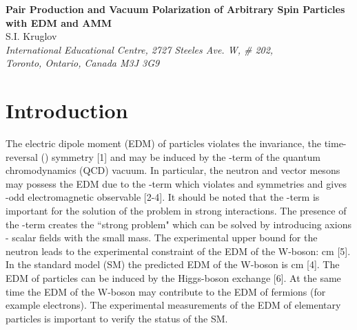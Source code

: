 \documentclass[a4paper,12pt]{article}
\begin{document}
\begin{center}
{\bf Pair Production and Vacuum Polarization of Arbitrary Spin
Particles with EDM and AMM}\\
\vspace{5mm}
 S.I. Kruglov \\
\vspace{5mm}
\textit{International Educational Centre, 2727 Steeles Ave. W, \# 202, \\
Toronto, Ontario, Canada M3J 3G9}
\end{center}

\begin{abstract}
The exact solutions of the wave equation for arbitrary spin particles with
electric dipole and magnetic moments in the constant and uniform
electromagnetic field were found. The differential probability of pair
production of particles by an external electromagnetic field has been
calculated on the basis of the exact solutions. We have also estimated the
imaginary part of the constant and uniform electromagnetic field. The
nonlinear corrections to the Maxwell Lagrangian have been calculated taking
into account the vacuum polarization of arbitrary spin particles. The role
of electric dipole and magnetic moments of arbitrary spin particles in
instability of the vacuum is discussed.
\end{abstract}

\section{Introduction}

The electric dipole moment (EDM) of particles violates the \coordHE{} invariance,
the time-reversal (\coordHE{}) symmetry [1] and may be induced by the \myHighlight{$\vartheta $}\coordHE{}
-term of the quantum chromodynamics (QCD) vacuum. In particular, the neutron
and vector mesons may possess the EDM due to the \myHighlight{$\vartheta $}\coordHE{}-term which
violates \coordHE{} and \coordHE{} symmetries and gives \coordHE{}-odd electromagnetic
observable [2-4]. It should be noted that the \myHighlight{$\vartheta $}\coordHE{}-term is important
for the solution of the \coordHE{} problem in strong interactions. The
presence of the \myHighlight{$\vartheta $}\coordHE{}-term creates the ``strong \coordHE{} problem" which
can be solved by introducing axions - scalar fields with the small mass. The
experimental upper bound for the neutron leads to the experimental
constraint of the EDM of the W-boson: \coordHE{} cm [5]. In the
standard model (SM) the predicted EDM of the W-boson is \coordHE{}
cm [4]. The EDM of particles can be induced by the Higgs-boson exchange [6].
At the same time the EDM of the W-boson may contribute to the EDM of
fermions (for example electrons). The experimental measurements of the EDM
of elementary particles is important to verify the status of the SM.
\end{document}
